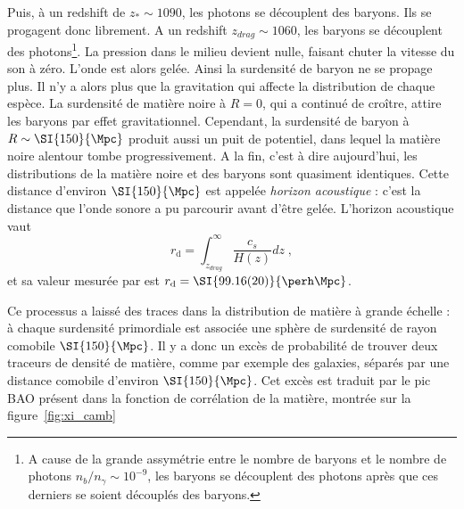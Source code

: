 Puis, à un redshift de $z_{\ast} \sim 1090$, les photons se découplent des baryons. Ils se progagent donc librement.
A un redshift $z_{drag} \sim 1060$, les baryons se découplent des photons\footnote{A cause de la grande assymétrie entre le nombre de baryons et le nombre de photons $n_{b} / n_{\gamma} \sim 10^{-9}$, les baryons se découplent des photons après que ces derniers se soient découplés des baryons.}. La pression dans le milieu devient nulle, faisant chuter la vitesse du son à zéro. L'onde est alors gelée. Ainsi la surdensité de baryon ne se propage plus. Il n'y a alors plus que la gravitation qui affecte la distribution de chaque espèce.
La surdensité de matière noire à $R = 0$, qui a continué de croître, attire les baryons par effet gravitationnel. Cependant, la surdensité de baryon à $R \sim \SI{150}{\Mpc}$ produit aussi un puit de potentiel, dans lequel la matière noire alentour tombe progressivement.
A la fin, c'est à dire aujourd'hui, les distributions de la matière noire et des baryons sont quasiment identiques.
Cette distance d'environ $\SI{150}{\Mpc}$ est appelée \emph{horizon acoustique} : c'est la distance que l'onde sonore a pu parcourir avant d'être gelée. L'horizon acoustique vaut
\begin{equation}
  \label{eq:sound_horizon}
  r_\mathrm{d} = \int^{\infty}_{z_{drag}} \frac{c_{s}}{H(z)} dz  \; ,
\end{equation}
et sa valeur mesurée par \textcite{Collaboration2018} est $r_\mathrm{d} = \SI{99.16(20)}{\perh\Mpc}$.

Ce processus a laissé des traces dans la distribution de matière à grande échelle : à chaque surdensité primordiale est associée une sphère de surdensité de rayon comobile $\SI{150}{\Mpc}$.
Il y a donc un excès de probabilité de trouver deux traceurs de densité de matière, comme par exemple des galaxies, séparés par une distance  comobile d'environ $\SI{150}{\Mpc}$.
Cet excès est traduit par le pic BAO présent dans la fonction de corrélation de la matière, montrée sur la figure~\ref{fig:xi_camb}


